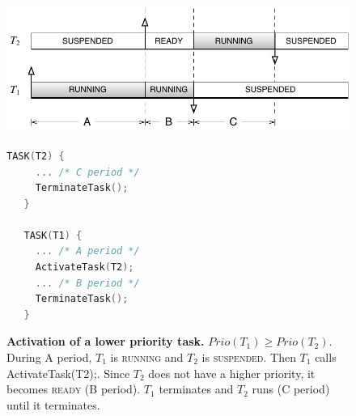 \begin{figure}[htbp] %
   \centering
   \begin{minipage}[c]{.6\linewidth}
   \includegraphics[scale=.7]{pictures/schedulingT1lp.pdf}
   \end{minipage}\hfill
   \begin{minipage}[c]{.3\linewidth}
   \begin{lstlisting}[language=C]
   TASK(T2) {
     ... /* C period */
     TerminateTask();
   }
   
   TASK(T1) {
     ... /* A period */
     ActivateTask(T2);
     ... /* B period */
     TerminateTask();
   }
 \end{lstlisting}
   \end{minipage}
   \caption{{\bfseries Activation of a lower priority task.} $Prio(T_1) \ge Prio(T_2)$. During A period, $T_1$ is {\sffamily\scshape running} and $T_2$ is {\sffamily\scshape suspended}. Then $T_1$ calls {\upshape\ttfamily ActivateTask(T2);}. Since $T_2$ does not have a higher priority, it becomes {\sffamily\scshape ready} (B period).  $T_1$ terminates and $T_2$ runs (C period) until it terminates.}
   \label{fig:scheduleT1lp}
\end{figure} 

